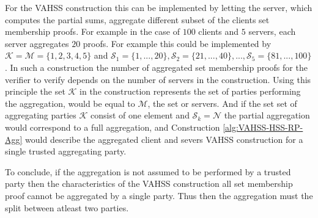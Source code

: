 For the VAHSS construction this can be implemented by letting the server, which computes the partial sums, aggregate different subset of the clients set membership proofs. For example in the case of $100$ clients and $5$ servers, each server aggregates $20$ proofs. For example this could be implemented by $\mathcal{K} = \mathcal{M} = \{1,2,3,4,5\}$ and $\mathcal{S}_1 = \{1,...,20\},\mathcal{S}_2 = \{21,...,40\},..., \mathcal{S}_5 = \{81,...,100\}$.  In such a construction the number of aggregated set membership proofs for the verifier to verify depends on the number of servers in the construction. Using this principle the set $\mathcal{K}$ in the construction represents the set of parties performing the aggregation, would be equal to $\mathcal{M}$, the set or servers. And if the set set of aggregating parties $\mathcal{K}$ consist of one element and $\mathcal{S}_k  = \mathcal{N}$ the partial aggregation would correspond to a full aggregation, and Construction \ref{alg:VAHSS-HSS-RP-Agg} would describe the aggregated client and severs VAHSS construction for a single trusted aggregating party. 

To conclude, if the aggregation is not assumed to be performed by a trusted party then the characteristics of the VAHSS construction all set membership proof cannot be aggregated by a single party. Thus then the aggregation must the split between atleast two parties.  




